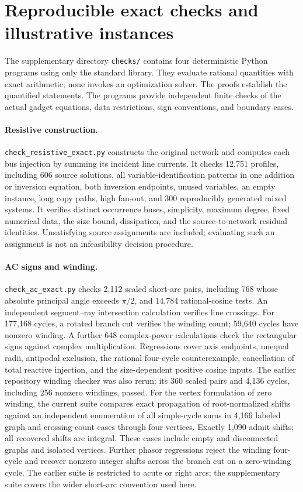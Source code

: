 \section{Reproducible exact checks and illustrative instances}
\label{app:verification}

The supplementary directory \texttt{checks/} contains four deterministic
Python programs using only the standard library. They evaluate rational
quantities with exact arithmetic; none invokes an optimization solver.
The proofs establish the quantified statements. The programs provide
independent finite checks of the actual gadget equations, data restrictions,
sign conventions, and boundary cases.

\paragraph{Resistive construction.}
\texttt{check\_resistive\_exact.py} constructs the original network and
computes each bus injection by summing its incident line currents. It checks
12,751 profiles, including 606 source solutions, all variable-identification
patterns in one addition or inversion equation, both inversion endpoints,
unused variables, an empty instance, long copy paths, high fan-out, and
300 reproducibly generated mixed systems. It verifies distinct occurrence
buses, simplicity, maximum degree, fixed numerical data, the size bound,
dissipation, and the source-to-network residual identities. Unsatisfying
source assignments are included; evaluating such an assignment is not an
infeasibility decision procedure.

\paragraph{AC signs and winding.}
\texttt{check\_ac\_exact.py} checks 2,112 scaled short-arc pairs, including
768 whose absolute principal angle exceeds $\pi/2$, and 14,784 rational-cosine tests.
An independent segment--ray intersection calculation verifies line crossings.
For 177,168 cycles, a rotated branch cut verifies the winding count;
59,640 cycles have nonzero winding. A further 648 complex-power calculations
check the rectangular signs against complex multiplication. Regressions cover
axis endpoints, unequal radii, antipodal exclusion, the rational four-cycle
counterexample, cancellation of total reactive injection, and the
size-dependent positive cosine inputs. The earlier repository winding checker
was also rerun: its 360 scaled pairs and 4,136 cycles, including 256 nonzero
windings, passed. For the vertex formulation of zero winding, the current
suite compares exact propagation of root-normalized shifts against an
independent enumeration of all simple-cycle sums in 4,166 labeled graph
and crossing-count cases through four vertices. Exactly 1,090 admit shifts;
all recovered shifts are integral. These cases include empty and disconnected
graphs and isolated vertices. Further phasor regressions reject the winding
four-cycle and recover nonzero integer shifts across the branch cut on a
zero-winding cycle. The earlier suite
is restricted to acute or right arcs;
the supplementary suite covers the wider short-arc convention used here.


